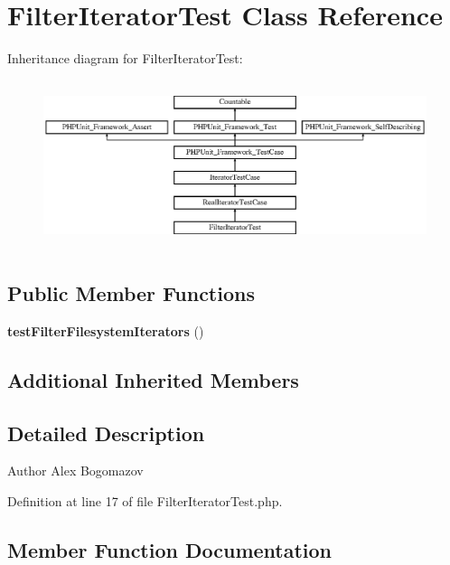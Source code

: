 \section{Filter\+Iterator\+Test Class Reference}
\label{class_symfony_1_1_component_1_1_finder_1_1_tests_1_1_iterator_1_1_filter_iterator_test}
Inheritance diagram for Filter\+Iterator\+Test\+:\begin{figure}[H]
\begin{center}
\leavevmode
\includegraphics[height=4.955752cm]{class_symfony_1_1_component_1_1_finder_1_1_tests_1_1_iterator_1_1_filter_iterator_test}
\end{center}
\end{figure}
\subsection*{Public Member Functions}
\begin{DoxyCompactItemize}
\item 
{\bf test\+Filter\+Filesystem\+Iterators} ()
\end{DoxyCompactItemize}
\subsection*{Additional Inherited Members}


\subsection{Detailed Description}
\begin{DoxyAuthor}{Author}
Alex Bogomazov 
\end{DoxyAuthor}


Definition at line 17 of file Filter\+Iterator\+Test.\+php.



\subsection{Member Function Documentation}
